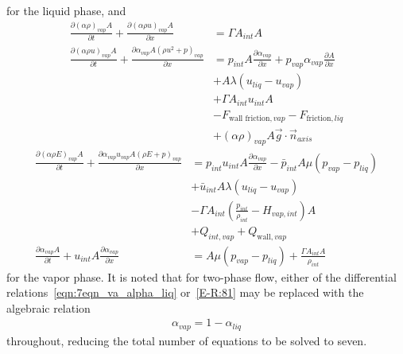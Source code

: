 for the liquid phase, and
\begin{align}
  \frac{\partial \left( \alpha \rho \right)_{vap} A}{\partial t}
  + \frac{\partial \left( \alpha \rho u \right)_{vap} A}{\partial x}
  &=  \Gamma A_{int} A
  \\
  \nonumber
  \frac{\partial \left( \alpha \rho u \right)_{vap} A}{\partial t}
  + \frac{\partial \alpha_{vap} A \left( \rho u^2 + p \right)_{vap} }{\partial x}
  &= p_{int} A \frac{\partial \alpha_{vap}}{\partial x} + p_{vap} \alpha_{vap} \frac{\partial A}{\partial x}
  \\
  \nonumber
  &+ A \lambda (u_{liq} - u_{vap})
  \\
  \nonumber
  &+ \Gamma A_{int} u_{int} A
  \\
  \nonumber
  &- F_{\text{wall friction}, vap} - F_{\text{friction}, liq}
  \\
  &+ \left( \alpha \rho \right)_{vap} A \vec{g} \cdot \vec{n}_{axis}
\end{align}
\begin{align}
  \nonumber
  \frac{\partial \left( \alpha \rho E \right)_{vap} A}{\partial t}
  + \frac{\partial \alpha_{vap} u_{vap} A \left( \rho E + p \right)_{vap}}{\partial x}
  &= p_{int} u_{int} A \frac{\partial \alpha_{vap}}{\partial x} - \bar{p}_{int} A \mu (p_{vap} - p_{liq})
  \\
  \nonumber
  &+ \bar{u}_{int} A \lambda (u_{liq} - u_{vap})
  \\
  \nonumber
  &- \Gamma A_{int} \left( \frac{p_{int}}{\rho_{int}} - H_{vap, int} \right) A
  \\
  &+ Q_{int, vap} + Q_{\text{wall}, vap}
  \\
  \label{E-R:81}
  \frac{\partial \alpha_{vap} A}{\partial t} + u_{int} A \frac{\partial \alpha_{vap}}{\partial x}
  &= A \mu (p_{vap} - p_{liq}) + \frac{\Gamma A_{int} A}{\rho_{int}}
\end{align}
for the vapor phase.  It is noted that for two-phase flow,
either of the differential relations~\eqref{eqn:7eqn_va_alpha_liq}
or~\eqref{E-R:81} may be replaced with the algebraic relation
\begin{align}
 \alpha_{vap}= 1 - \alpha_{liq}
\end{align}
throughout, reducing the total number of equations to be solved to seven.

